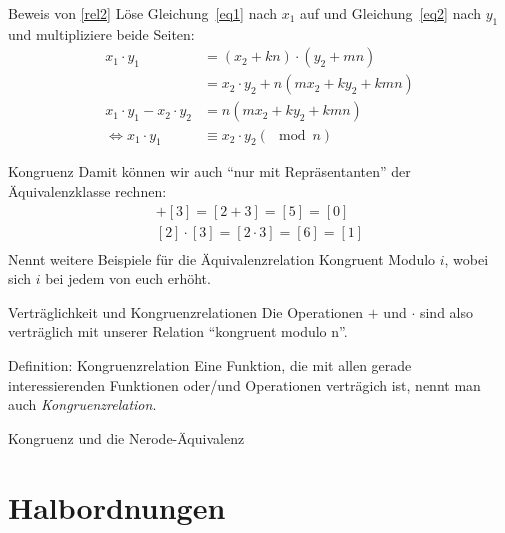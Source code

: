 \begin{frame}{Beweis von \eqref{rel2}}
    Löse Gleichung~\eqref{eq1} nach $x_1$ auf und Gleichung~\eqref{eq2} nach $y_1$ und multipliziere beide Seiten:
    \begin{align*}
        x_1 \cdot y_1 &= \left( x_2 + kn \right) \cdot \left( y_2 + mn \right)\\
                        &= x_2 \cdot y_2 + n\left( mx_2 + ky_2 + kmn \right)\\
        x_1 \cdot y_1 - x_2 \cdot y_2  &= n\left( mx_2 + ky_2 + kmn \right)\\
            \Longleftrightarrow x_1\cdot y_1 &\equiv x_2 \cdot y_2 \left( \mod n \right)
    \end{align*}
\end{frame}
\begin{frame}{Kongruenz}
    Damit können wir auch ``nur mit Repräsentanten'' der Äquivalenzklasse rechnen:
    \begin{align*}
        [2] + [3] = [2 + 3] = [5] = [0]\\
        [2] \cdot [3] = [2 \cdot 3] = [6] = [1]\\
    \end{align*}
    Nennt weitere Beispiele für die Äquivalenzrelation Kongruent Modulo $i$, wobei sich $i$ bei jedem von euch erhöht.
\end{frame}
\begin{frame}{Verträglichkeit und Kongruenzrelationen}
    Die Operationen $+$ und $\cdot$ sind also verträglich mit unserer Relation ``kongruent modulo n''.\\
    \begin{block}{Definition: Kongruenzrelation}
        Eine Funktion, die mit allen gerade interessierenden Funktionen oder/und Operationen verträgich ist, nennt man auch \emph{Kongruenzrelation}.
    \end{block}
\end{frame}
\begin{frame}{Kongruenz und die Nerode-Äquivalenz}
    
\end{frame}
\section{Halbordnungen}

